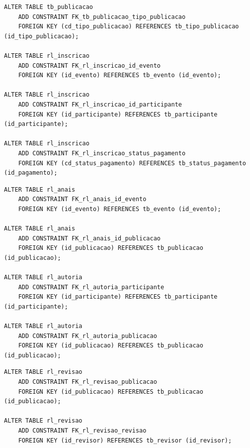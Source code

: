 \documentclass[12pt,a4paper]{article}
\begin{document}
\noindent\begin{minipage}{\linewidth}
\begin{lstlisting}[caption={DDL --- chaves estrangeiras de \texttt{tb\_publicacao} e \texttt{rl\_inscricao}.}, label={lst:fk-publicacao-inscricao}]
ALTER TABLE tb_publicacao
    ADD CONSTRAINT FK_tb_publicacao_tipo_publicacao
    FOREIGN KEY (cd_tipo_publicacao) REFERENCES tb_tipo_publicacao (id_tipo_publicacao);

ALTER TABLE rl_inscricao
    ADD CONSTRAINT FK_rl_inscricao_id_evento
    FOREIGN KEY (id_evento) REFERENCES tb_evento (id_evento);

ALTER TABLE rl_inscricao
    ADD CONSTRAINT FK_rl_inscricao_id_participante
    FOREIGN KEY (id_participante) REFERENCES tb_participante (id_participante);

ALTER TABLE rl_inscricao
    ADD CONSTRAINT FK_rl_inscricao_status_pagamento
    FOREIGN KEY (cd_status_pagamento) REFERENCES tb_status_pagamento (id_pagamento);
\end{lstlisting}
\end{minipage}

\noindent\begin{minipage}{\linewidth}
\begin{lstlisting}[caption={DDL --- chaves estrangeiras de \texttt{rl\_anais} e \texttt{rl\_autoria}.}, label={lst:fk-anais-autoria}]
ALTER TABLE rl_anais
    ADD CONSTRAINT FK_rl_anais_id_evento
    FOREIGN KEY (id_evento) REFERENCES tb_evento (id_evento);

ALTER TABLE rl_anais
    ADD CONSTRAINT FK_rl_anais_id_publicacao
    FOREIGN KEY (id_publicacao) REFERENCES tb_publicacao (id_publicacao);

ALTER TABLE rl_autoria
    ADD CONSTRAINT FK_rl_autoria_participante
    FOREIGN KEY (id_participante) REFERENCES tb_participante (id_participante);

ALTER TABLE rl_autoria
    ADD CONSTRAINT FK_rl_autoria_publicacao
    FOREIGN KEY (id_publicacao) REFERENCES tb_publicacao (id_publicacao);
\end{lstlisting}
\end{minipage}

\noindent\begin{minipage}{\linewidth}
\begin{lstlisting}[caption={DDL --- chaves estrangeiras de \texttt{rl\_revisao}.}, label={lst:fk-revisao}]
ALTER TABLE rl_revisao
    ADD CONSTRAINT FK_rl_revisao_publicacao
    FOREIGN KEY (id_publicacao) REFERENCES tb_publicacao (id_publicacao);

ALTER TABLE rl_revisao
    ADD CONSTRAINT FK_rl_revisao_revisao
    FOREIGN KEY (id_revisor) REFERENCES tb_revisor (id_revisor);
\end{lstlisting}
\end{minipage}
\end{document}
